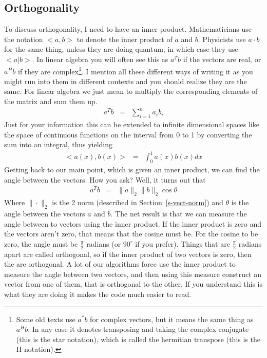 \subsection{Orthogonality}
To discuss orthogonality, I need to have an inner product.  Mathematicians use the notation $<a,b>$ to denote the inner product of $a$ and $b$.  Physicists use $a\cdot b$ for the same thing, unless they are doing quantum, in which case they use $<a|b>$.  In linear algebra you will often see this as $a^Tb$ if the vectors are real, or $a^Hb$ if they are complex\footnote{Some old texts use $a^*b$ for complex vectors, but it means the same thing as $a^Hb$.  In any case it denotes transposing and taking the complex conjugate (this is the star notation), which is called the hermitian transpose (this is the H notation).}.  I mention all these different ways of writing it as you might run into them in different contexts and you should realize they are the same.  For linear algebra we just mean to multiply the corresponding elements of the matrix and sum them up.
\begin{eqnarray}
a^Tb &=& \sum_{i=1}^na_ib_i
\end{eqnarray}
Just for your information this can be extended to infinite dimensional spaces like  the space of continuous functions on the interval from 0 to 1 by converting the sum into an integral, thus yielding
\begin{eqnarray}
<a(x),b(x)> &=& \int_{0}^1a(x)b(x)dx
\end{eqnarray}
Getting back to our main point, which is given an inner product, we can find the angle between the vectors.  How you ask?  Well, it turns out that
\begin{eqnarray}
a^Tb &=& \|a\|_2\|b\|_2\cos\theta
\end{eqnarray}
Where $\|\cdot\|_2$ is the 2 norm (described in Section~\ref{s-vect-norm}) and $\theta$ is the angle between the vectors $a$ and $b$.  The net result is that we can measure the angle between to vectors using the inner product.  If the inner product is zero and the vectors aren't zero, that means that the cosine must be.  For the cosine to be zero, the angle must be $\frac{\pi}{2}$ radians (or $90^\circ$ if you prefer).  Things that are $\frac{\pi}{2}$ radians apart are called orthogonal, so if the inner product of two vectors is zero, then the are orthogonal.  A lot of our algorithms force use the inner product to measure the angle between two vectors, and then using this measure construct an vector from one of them, that is orthogonal to the other.  If you understand this is what they are doing it makes the code much easier to read.

